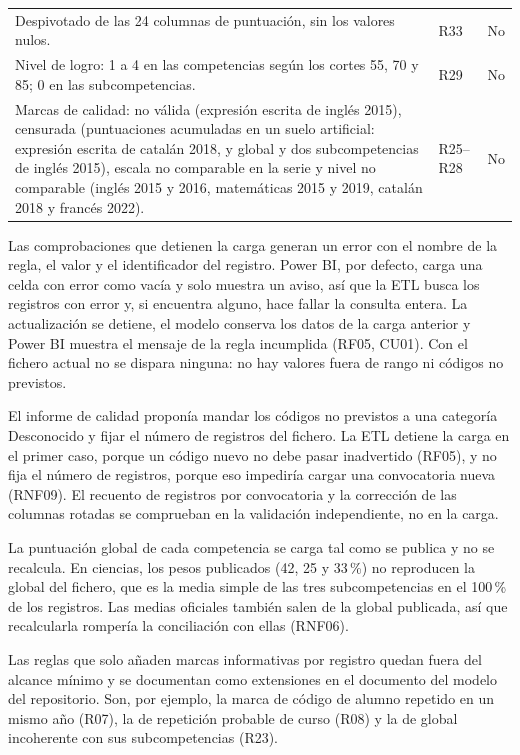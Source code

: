 \documentclass[12pt, a4paper, oneside]{report}
\begin{document}
{\begin{longtable}{@{} p{10.2cm} >{\raggedright\arraybackslash}p{2.1cm} >{\raggedright\arraybackslash}p{2.0cm} @{}}
Despivotado de las 24 columnas de puntuación, sin los valores nulos. & R33 & No \\ \addlinespace
Nivel de logro: 1 a 4 en las competencias según los cortes 55, 70 y 85; 0 en las subcompetencias. & R29 & No \\ \addlinespace
Marcas de calidad: no válida (expresión escrita de inglés 2015), censurada (puntuaciones acumuladas en un suelo artificial: expresión escrita de catalán 2018, y global y dos subcompetencias de inglés 2015), escala no comparable en la serie y nivel no comparable (inglés 2015 y 2016, matemáticas 2015 y 2019, catalán 2018 y francés 2022). & R25--R28 & No \\
\end{longtable}}

Las comprobaciones que detienen la carga generan un error con el nombre de la regla, el valor y el identificador del registro. Power BI, por defecto, carga una celda con error como vacía y solo muestra un aviso, así que la ETL busca los registros con error y, si encuentra alguno, hace fallar la consulta entera. La actualización se detiene, el modelo conserva los datos de la carga anterior y Power BI muestra el mensaje de la regla incumplida (RF05, CU01). Con el fichero actual no se dispara ninguna: no hay valores fuera de rango ni códigos no previstos.

El informe de calidad proponía mandar los códigos no previstos a una categoría \guillemotleft{}Desconocido\guillemotright{} y fijar el número de registros del fichero. La ETL detiene la carga en el primer caso, porque un código nuevo no debe pasar inadvertido (RF05), y no fija el número de registros, porque eso impediría cargar una convocatoria nueva (RNF09). El recuento de registros por convocatoria y la corrección de las columnas rotadas se comprueban en la validación independiente, no en la carga.

La puntuación global de cada competencia se carga tal como se publica y no se recalcula. En ciencias, los pesos publicados (42, 25 y 33\,\%) no reproducen la global del fichero, que es la media simple de las tres subcompetencias en el 100\,\% de los registros. Las medias oficiales también salen de la global publicada, así que recalcularla rompería la conciliación con ellas (RNF06).

Las reglas que solo añaden marcas informativas por registro quedan fuera del alcance mínimo y se documentan como extensiones en el documento del modelo del repositorio. Son, por ejemplo, la marca de código de alumno repetido en un mismo año (R07), la de repetición probable de curso (R08) y la de global incoherente con sus subcompetencias (R23).
\end{document}
